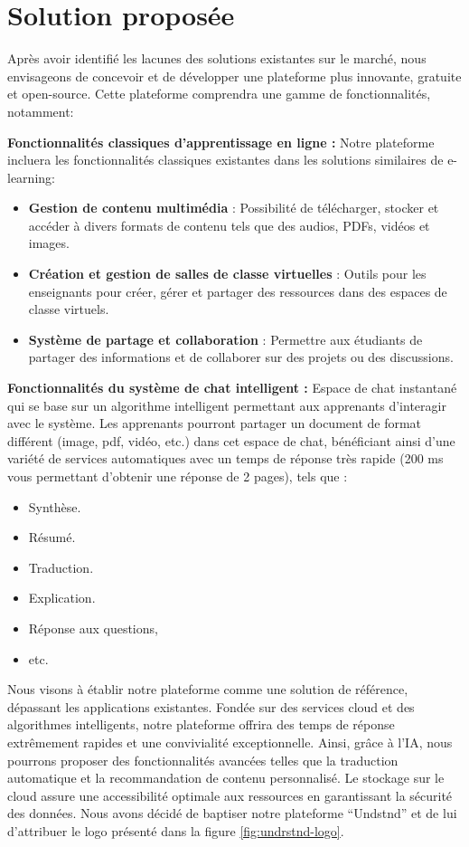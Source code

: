 \section{Solution proposée}
Après avoir identifié les lacunes des solutions existantes sur le marché, nous envisageons de concevoir et de développer une plateforme plus innovante, gratuite et open-source. 
Cette plateforme comprendra une gamme de fonctionnalités, notamment:

\vspace{0.5em}
\textbf{Fonctionnalités classiques d'apprentissage en ligne :}
Notre plateforme incluera les fonctionnalités classiques existantes dans les solutions similaires de e-learning:
\begin{itemize}[itemsep=2pt, parsep=2pt]
    \item \textbf{Gestion de contenu multimédia} : Possibilité de télécharger, stocker et accéder à divers formats de contenu tels que des audios, PDFs, vidéos et images.
    \item \textbf{Création et gestion de salles de classe virtuelles} : Outils pour les enseignants pour créer, gérer et partager des ressources dans des espaces de classe virtuels.
    \item \textbf{Système de partage et collaboration} : Permettre aux étudiants de partager des informations et de collaborer sur des projets ou des discussions.
\end{itemize}

\vspace{0.5em}
\textbf{Fonctionnalités du système de chat intelligent :}
Espace de chat instantané qui se base sur un algorithme intelligent permettant aux apprenants d'interagir avec le système. Les apprenants pourront partager un document de format différent (image, pdf, vidéo, etc.) dans cet espace de chat, bénéficiant ainsi d'une variété de services automatiques avec un temps de réponse très rapide (200 ms vous permettant d'obtenir une réponse de 2 pages),  tels que :
\begin{itemize}[itemsep=2pt, parsep=2pt]
    \item Synthèse.
    \item Résumé.
    \item Traduction.
    \item Explication.
    \item Réponse aux questions, 
    \item etc.
\end{itemize}

\vspace{0.5em}
Nous visons à établir notre plateforme comme une solution de référence, dépassant les applications existantes. Fondée sur des services cloud et des algorithmes intelligents, notre plateforme offrira des temps de réponse extrêmement rapides et une convivialité exceptionnelle. Ainsi, grâce à l'IA, nous pourrons proposer des fonctionnalités avancées telles que la traduction automatique et la recommandation de contenu personnalisé. Le stockage sur le cloud assure une accessibilité optimale aux ressources en garantissant la sécurité des données. 
Nous avons  décidé de baptiser notre plateforme “Undstnd” et de lui d’attribuer le logo présenté dans la figure \ref{fig:undrstnd-logo}. 

